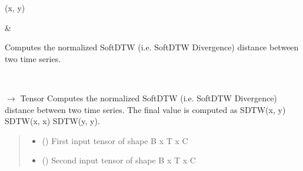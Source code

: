\documentclass[letterpaper,10pt,english]{sphinxmanual}
\begin{document}
\begin{fulllineitems}
\begin{savenotes}
\begin{longtable}{}
\endlastfoot
\sphinxtableatstartofbodyhook
\begin{varwidth}[t]{}
\sphinxAtStartPar
{\hyperref[\detokenize{dtw_loss_functions.soft_dtw_implementations.pysdtw_normalize:dtw_loss_functions.soft_dtw_implementations.pysdtw_normalize.pysdtw_normalized.forward}]{}}(x, y)
\sphinxbeforeendvarwidth
\end{varwidth}%
&\begin{varwidth}[t]{}
\sphinxAtStartPar
Computes the normalized SoftDTW (i.e. SoftDTW Divergence) distance between two time series.
\sphinxbeforeendvarwidth
\end{varwidth}%
\\
\sphinxbottomrule
\end{longtable}
\sphinxtableafterendhook
\sphinxatlongtableend
\end{savenotes}

\begin{fulllineitems}
\label{\detokenize{dtw_loss_functions.soft_dtw_implementations.pysdtw_normalize:dtw_loss_functions.soft_dtw_implementations.pysdtw_normalize.pysdtw_normalized.forward}}
\pysigstartsignatures
\pysiglinewithargsret
{}
{\sphinxparamcomma {}}
{{ $\rightarrow$ Tensor}}
\pysigstopsignatures
\sphinxAtStartPar
Computes the normalized SoftDTW (i.e. SoftDTW Divergence) distance between two time series.
The final value is computed as SDTW(x, y) \sphinxhyphen{} SDTW(x, x) \sphinxhyphen{} SDTW(y, y).
\begin{quote}\begin{description}
\begin{itemize}
\item {} 
\sphinxAtStartPar
{} () \textendash{} First input tensor of shape B x T x C

\item {} 
\sphinxAtStartPar
{} () \textendash{} Second input tensor of shape B x T x C


\end{itemize}
\end{description}
\end{quote}
\end{fulllineitems}
\end{fulllineitems}
\end{document}
